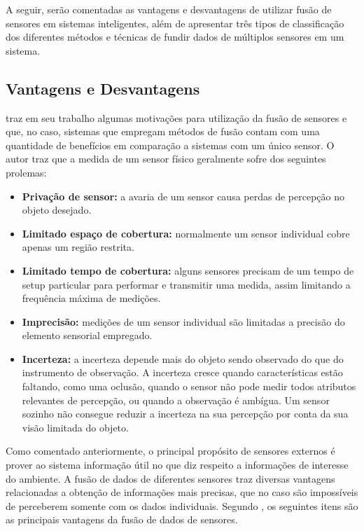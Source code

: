 \documentclass[acronym, symbols]{fei}
\begin{document}
		A seguir, serão comentadas as vantagens e desvantagens de utilizar fusão de sensores em sistemas inteligentes, além de apresentar três tipos de classificação dos diferentes métodos e técnicas de fundir dados de múltiplos sensores em um sistema.
		
		\subsection{Vantagens e Desvantagens}
		
			\textcite{elmenreich2002introduction} traz em seu trabalho algumas motivações para utilização da fusão de sensores e que, no caso, sistemas que empregam métodos de fusão contam com uma quantidade de benefícios em comparação a sistemas com um único sensor. O autor traz que a medida de um sensor físico geralmente sofre dos seguintes prolemas:
		
			\begin{itemize}
				\item \textbf{Privação de sensor:} a avaria de um sensor causa perdas de percepção no objeto desejado.
				
				\item \textbf{Limitado espaço de cobertura:} normalmente um sensor individual cobre apenas um região restrita.
				
				\item \textbf{Limitado tempo de cobertura:} alguns sensores precisam de um tempo de setup particular para performar e transmitir uma medida, assim limitando a frequência máxima de medições.
				
				\item \textbf{Imprecisão:} medições de um sensor individual são limitadas a precisão do elemento sensorial empregado.
				
				\item \textbf{Incerteza: } a incerteza depende mais do objeto sendo observado do que do instrumento de observação. A incerteza cresce quando características estão faltando, como uma oclusão, quando o sensor não pode medir todos atributos relevantes de percepção, ou quando a observação é ambígua. Um sensor sozinho não consegue reduzir a incerteza na sua percepção por conta da sua visão limitada do objeto.
			\end{itemize}
			
			Como comentado anteriormente, o principal propósito de sensores externos é prover ao sistema informação útil no que diz respeito a informações de interesse do ambiente. A fusão de dados de diferentes sensores traz diversas vantagens relacionadas a obtenção de informações mais precisas, que no caso são impossíveis de perceberem somente com os dados individuais. Segundo \textcite{luo1990tutorial}, os seguintes itens são as principais vantagens da fusão de dados de sensores.
			
\end{document}
